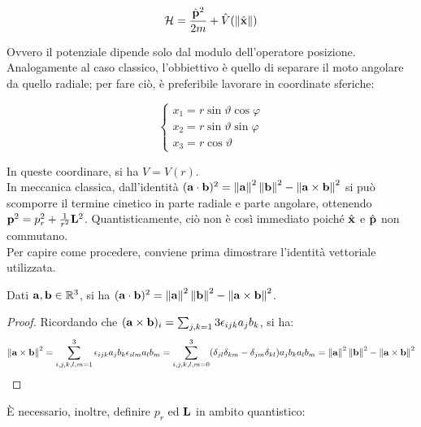 \begin{equation}
	\mathcal{H} = \frac{\hat{\mathbf{p}}^2}{2m} + \hat{V}(\left\lVert\hat{\mathbf{x}}\right\rVert)
	\label{eq:27}
\end{equation}

Ovvero il potenziale dipende solo dal modulo dell'operatore posizione.\\
Analogamente al caso classico, l'obbiettivo è quello di separare il moto angolare da quello radiale; per fare ciò, è preferibile lavorare in coordinate sferiche:

\begin{equation}
	\begin{cases}
		x_1 = r \sin \vartheta \cos \varphi \\
		x_2 = r \sin \vartheta \sin \varphi \\
		x_3 = r \cos \vartheta
	\end{cases}
	\label{eq:28}
\end{equation}

In queste coordinare, si ha $ V = V(r) $.\\
In meccanica classica, dall'identità $ (\mathbf{a}\cdot\mathbf{b})^2 = \left\lVert\mathbf{a}\right\rVert^2 \left\lVert\mathbf{b}\right\rVert^2 - \left\lVert\mathbf{a}\times\mathbf{b}\right\rVert^2 $ si può scomporre il termine cinetico in parte radiale e parte angolare, ottenendo $ \mathbf{p}^2 = p_r^2 + \frac{1}{r^2}\mathbf{L}^2 $. Quantisticamente, ciò non è così immediato poiché $ \hat{\mathbf{x}} $ e $ \hat{\mathbf{p}} $ non commutano.\\
Per capire come procedere, conviene prima dimostrare l'identità vettoriale utilizzata.

\begin{proposition}\label{cross-class}
	Dati $ \mathbf{a}, \mathbf{b} \in\mathbb{R}^3 $, si ha $ (\mathbf{a}\cdot\mathbf{b})^2 = \left\lVert\mathbf{a}\right\rVert^2 \left\lVert\mathbf{b}\right\rVert^2 - \left\lVert\mathbf{a}\times\mathbf{b}\right\rVert^2 $.
\end{proposition}
\begin{proof}
	Ricordando che $ (\mathbf{a}\times\mathbf{b})_i = \sum_{j,k = 1}{3} \epsilon_{ijk} a_j b_k $, si ha:
	\begin{equation*}
		\left\lVert\mathbf{a}\times\mathbf{b}\right\rVert^2 = \sum_{i,j,k,l,m = 1}^{3} \epsilon_{ijk} a_j b_k \epsilon_{ilm} a_l b_m = \sum_{i,j,k,l,m = 0}^{3} (\delta_{jl}\delta_{km} - \delta_{jm}\delta_{kl}) a_j b_k a_l b_m = \left\lVert\mathbf{a}\right\rVert^2 \left\lVert\mathbf{b}\right\rVert^2 - \left\lVert\mathbf{a}\times\mathbf{b}\right\rVert^2
	\end{equation*}
\end{proof}

È necessario, inoltre, definire $ p_r $ ed $ \mathbf{L} $ in ambito quantistico:

